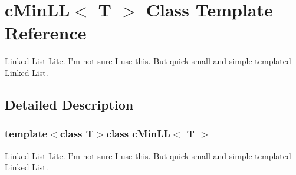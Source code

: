 \hypertarget{classc_min_l_l}{
\section{cMinLL$<$ T $>$ Class Template Reference}
\label{classc_min_l_l}
}


Linked List Lite. I'm not sure I use this. But quick small and simple templated Linked List.  




\subsection{Detailed Description}
\subsubsection*{template$<$class T$>$class cMinLL$<$ T $>$}

Linked List Lite. I'm not sure I use this. But quick small and simple templated Linked List. 